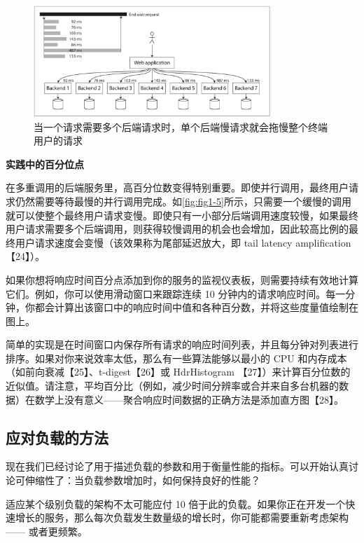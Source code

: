 \begin{figure}[htbp]
  \centering
  \includegraphics[width=0.8\textwidth]{img/fig1-5.png}
  \caption{当一个请求需要多个后端请求时，单个后端慢请求就会拖慢整个终端用户的请求}
  \label{fig:fig1-5}
\end{figure}

\begin{mdframed}[backgroundcolor=black!10,rightline=false,leftline=false]
  \textbf{实践中的百分位点}

  在多重调用的后端服务里，高百分位数变得特别重要。即使并行调用，最终用户请求仍然需要等待最慢的并行调用完成。如\autoref{fig:fig1-5}所示，只需要一个缓慢的调用就可以使整个最终用户请求变慢。即使只有一小部分后端调用速度较慢，如果最终用户请求需要多个后端调用，则获得较慢调用的机会也会增加，因此较高比例的最终用户请求速度会变慢（该效果称为尾部延迟放大，即 tail latency amplification【24】）。

  如果你想将响应时间百分点添加到你的服务的监视仪表板，则需要持续有效地计算它们。例如，你可以使用滑动窗口来跟踪连续 10 分钟内的请求响应时间。每一分钟，你都会计算出该窗口中的响应时间中值和各种百分数，并将这些度量值绘制在图上。

  简单的实现是在时间窗口内保存所有请求的响应时间列表，并且每分钟对列表进行排序。如果对你来说效率太低，那么有一些算法能够以最小的 CPU 和内存成本（如前向衰减【25】、t-digest【26】或 HdrHistogram 【27】）来计算百分位数的近似值。请注意，平均百分比（例如，减少时间分辨率或合并来自多台机器的数据）在数学上没有意义——聚合响应时间数据的正确方法是添加直方图【28】。
\end{mdframed}

\subsection{应对负载的方法}
\label{sec:应对负载的方法}

现在我们已经讨论了用于描述负载的参数和用于衡量性能的指标。可以开始认真讨论可伸缩性了：当负载参数增加时，如何保持良好的性能？

适应某个级别负载的架构不太可能应付 10 倍于此的负载。如果你正在开发一个快速增长的服务，那么每次负载发生数量级的增长时，你可能都需要重新考虑架构 —— 或者更频繁。

